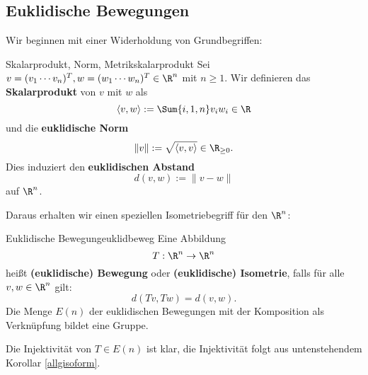 \subsection{Euklidische Bewegungen}
\label{subsec:euklidbewegungen}
Wir beginnen mit einer Widerholdung von Grundbegriffen:
\begin{definition}{Skalarprodukt, Norm, Metrik}{skalarprodukt}
Sei $v = (v_1 \cdots v_n)^T, w = (w_1 \cdots w_n)^T \in \R^n$ mit $n \geq 1$. Wir definieren das \textbf{Skalarprodukt} von $v$ mit $w$ als
\begin{equation}
\langle v,w \rangle := \Sum{i,1,n} v_iw_i \in \R
\end{equation}
und die \textbf{euklidische Norm}
\begin{equation}
\|v\| := \sqrt{\langle v, v \rangle} \in \R_{\geq 0}.
\end{equation}
Dies induziert den \textbf{euklidischen Abstand}
\begin{equation}
d(v,w) := \|v-w\|
\end{equation}
auf $\R^n$.
\end{definition}
Daraus erhalten wir einen speziellen Isometriebegriff für den $\R^n$:
\begin{definition}{Euklidische Bewegung}{euklidbeweg}
Eine Abbildung 
\begin{equation}
T: \R^n \to \R^n
\end{equation}
heißt \textbf{(euklidische) Bewegung} oder \textbf{(euklidische) Isometrie}, falls für alle $v,w \in \R^n$ gilt:
\begin{equation}
d(Tv,Tw) = d(v,w).
\end{equation}
Die Menge $E(n)$ der euklidischen Bewegungen mit der Komposition als Verknüpfung bildet eine Gruppe.
\end{definition}
\begin{bemerkung}
Die Injektivität von $T \in E(n)$ ist klar, die Injektivität folgt aus untenstehendem Korollar \ref{allgisoform}.
\end{bemerkung}
